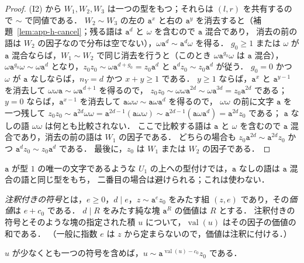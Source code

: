 \begin{proof}
(I2) から $W_1,W_2,W_3$ は一つの型をもつ；それらは $(l,r)$ を共有するので $\sim$ で同値である．
$W_2\sim W_3$ の左の $\mathtt a^x$ と右の $\mathtt a^y$ を消去すると（補題~\ref{lem:app-h-cancel}；残る語は $\mathtt a^d$ と $\omega$ を含むので $\mathtt a$ 混合であり，
消去の前の語は $W_2$ の因子なので分布は空でない），$\omega\mathtt a^d\sim\mathtt a^d\omega$ を得る．
$g_0\ge1$ または $\omega$ が $\mathtt a$ 混合ならば，$W_1\sim W_2$ で同じ消去を行うと（このとき $\omega\mathtt a^{g_0}\omega$ は $\mathtt a$ 混合），
$\omega\mathtt a^{g_0}\omega\sim\omega\mathtt a^d$ となり，$z_0z_0\sim\omega\mathtt a^{d+g_0}=z_0\mathtt a^d$ と $\mathtt a^dz_0\sim z_0\mathtt a^d$ が従う．
$g_0=0$ かつ $\omega$ が $\mathtt a$ なしならば，$n_Y=d$ かつ $x+y\ge1$ である．
$y\ge1$ ならば，$\mathtt a^x$ と $\mathtt a^{y-1}$ を消去して $\omega\omega\mathtt a\sim\omega\mathtt a^{d+1}$ を得るので，
$z_0z_0\sim\omega\omega\mathtt a^{2d}\sim\omega\mathtt a^{3d}=z_0\mathtt a^{2d}$ である；
$y=0$ ならば，$\mathtt a^{x-1}$ を消去して $\mathtt a\omega\omega\sim\mathtt a\omega\mathtt a^d$ を得るので，
$\omega\omega$ の前に文字 $\mathtt a$ を一つ残して
$z_0z_0\sim\mathtt a^{2d}\omega\omega=\mathtt a^{2d-1}(\mathtt a\omega\omega)\sim\mathtt a^{2d-1}(\mathtt a\omega\mathtt a^d)=\mathtt a^{2d}z_0$ である；
$\mathtt a$ なしの語 $\omega\omega$ は何とも比較されない．
ここで比較する語は $\mathtt a$ と $\omega$ を含むので $\mathtt a$ 混合であり，消去の前の語は $W_1$ の因子である．
どちらの場合も $z_0\mathtt a^{2d}\sim\mathtt a^{2d}z_0$ かつ $\mathtt a^dz_0\sim z_0\mathtt a^d$ である．
最後に，$z_0$ は $W_1$ または $W_2$ の因子である．
\end{proof}

$\mathtt a$ が型 $1$ の唯一の文字であるような $U_1$ の上への型付けでは，$\mathtt a$ なしの語は $\mathtt a$ 混合の語と同じ型をもち，
二番目の場合は避けられる；これは使わない．

\emph{注釈付きの符号}とは，$e\ge0$，$d\mid e$，$z\sim\mathtt a^ez_0$ をみたす組 $(z,e)$ であり，その\emph{価値}は $e+c_0$ である．
$d\mid R$ をみたす純な塊 $\mathtt a^R$ の価値は $R$ とする．
注釈付きの符号とそのような塊の指定された積 $u$ について，$\operatorname{val}(u)$ はその因子の価値の和である．
（一般に指数 $e$ は $z$ から定まらないので，価値は注釈に付ける．）

\begin{lemma}
\label{lem:app-h-collapse}
$u$ が少なくとも一つの符号を含めば，$u\sim\mathtt a^{\operatorname{val}(u)-c_0}z_0$ である．
\end{lemma}

